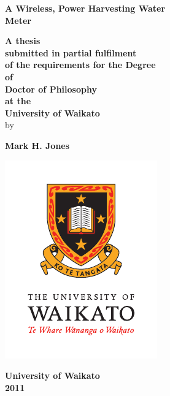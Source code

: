 \begin{titlepage}

\begin{center}
\textbf{\LARGE{}A Wireless, Power Harvesting Water}\\
\textbf{\LARGE{} \medskip{}
Meter}
\par\end{center}{\LARGE \par}

\begin{center}
\vspace{1cm}

\par\end{center}

\begin{center}
\textbf{A thesis}\\
\textbf{ \medskip{}
submitted in partial fulfilment}\\
\textbf{ \medskip{}
of the requirements for the Degree}\\
\textbf{ \medskip{}
of}\\
\textbf{ \medskip{}
Doctor of Philosophy}\\
\textbf{ \medskip{}
at the}\\
\textbf{ \medskip{}
University of Waikato}\\
\textbf{ \medskip{}
} by \vspace{1cm}

\par\end{center}

\begin{center}
\textbf{\large{}Mark H. Jones}
\par\end{center}{\large \par}

\begin{center}
\vspace{40pt}

\par\end{center}

\begin{center}
\includegraphics{Waik-Print-PMS-V}
\par\end{center}

\begin{center}
\textbf{University of Waikato}\\
\textbf{ \medskip{}
2011} 
\par\end{center}

\end{titlepage}
